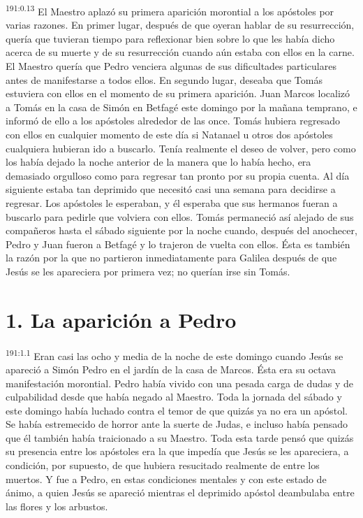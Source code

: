 \par 
\textsuperscript{191:0.13} El Maestro aplazó su primera aparición morontial a los apóstoles por varias razones. En primer lugar, después de que oyeran hablar de su resurrección, quería que tuvieran tiempo para reflexionar bien sobre lo que les había dicho acerca de su muerte y de su resurrección cuando aún estaba con ellos en la carne. El Maestro quería que Pedro venciera algunas de sus dificultades particulares antes de manifestarse a todos ellos. En segundo lugar, deseaba que Tomás estuviera con ellos en el momento de su primera aparición. Juan Marcos localizó a Tomás en la casa de Simón en Betfagé este domingo por la mañana temprano, e informó de ello a los apóstoles alrededor de las once. Tomás hubiera regresado con ellos en cualquier momento de este día si Natanael u otros dos apóstoles cualquiera hubieran ido a buscarlo. Tenía realmente el deseo de volver, pero como los había dejado la noche anterior de la manera que lo había hecho, era demasiado orgulloso como para regresar tan pronto por su propia cuenta. Al día siguiente estaba tan deprimido que necesitó casi una semana para decidirse a regresar. Los apóstoles le esperaban, y él esperaba que sus hermanos fueran a buscarlo para pedirle que volviera con ellos. Tomás permaneció así alejado de sus compañeros hasta el sábado siguiente por la noche cuando, después del anochecer, Pedro y Juan fueron a Betfagé y lo trajeron de vuelta con ellos. Ésta es también la razón por la que no partieron inmediatamente para Galilea después de que Jesús se les apareciera por primera vez; no querían irse sin Tomás.

\section*{1. La aparición a Pedro}
\par 
\textsuperscript{191:1.1} Eran casi las ocho y media de la noche de este domingo cuando Jesús se apareció a Simón Pedro en el jardín de la casa de Marcos. Ésta era su octava manifestación morontial. Pedro había vivido con una pesada carga de dudas y de culpabilidad desde que había negado al Maestro. Toda la jornada del sábado y este domingo había luchado contra el temor de que quizás ya no era un apóstol. Se había estremecido de horror ante la suerte de Judas, e incluso había pensado que él también había traicionado a su Maestro. Toda esta tarde pensó que quizás su presencia entre los apóstoles era la que impedía que Jesús se les apareciera, a condición, por supuesto, de que hubiera resucitado realmente de entre los muertos. Y fue a Pedro, en estas condiciones mentales y con este estado de ánimo, a quien Jesús se apareció mientras el deprimido apóstol deambulaba entre las flores y los arbustos.


